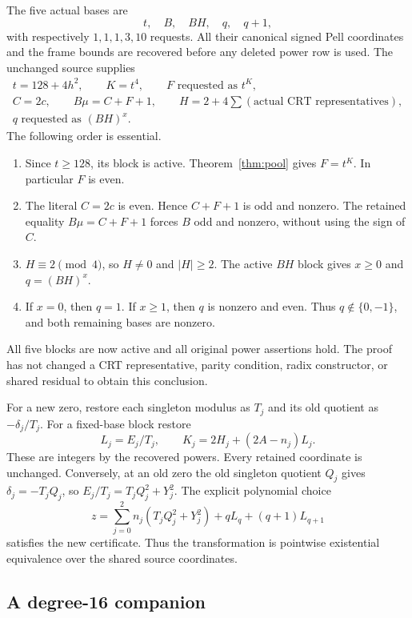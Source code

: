 The five actual bases are
\[
 t,\quad B,\quad BH,\quad q,\quad q+1,
\]
with respectively $1,1,1,3,10$ requests. All their canonical signed
Pell coordinates and the frame bounds are recovered before any deleted
power row is used. The unchanged source supplies
\begin{gather*}
 t=128+4h^2,\qquad K=t^4,\qquad F\text{ requested as }t^K,\\
 C=2c,\qquad B\mu=C+F+1,\qquad
 H=2+4\sum(\text{actual CRT representatives}),\\
 q\text{ requested as }(BH)^x.
\end{gather*}
The following order is essential.
\begin{enumerate}
\item Since $t\ge128$, its block is active. Theorem~\ref{thm:pool}
gives $F=t^K$. In particular $F$ is even.
\item The literal $C=2c$ is even. Hence $C+F+1$ is odd and nonzero.
The retained equality $B\mu=C+F+1$ forces $B$ odd and nonzero, without
using the sign of $C$.
\item $H\equiv2\pmod4$, so $H\ne0$ and $|H|\ge2$. The active
$BH$ block gives $x\ge0$ and $q=(BH)^x$.
\item If $x=0$, then $q=1$. If $x\ge1$, then $q$ is nonzero and
even. Thus $q\notin\{0,-1\}$, and both remaining bases are nonzero.
\end{enumerate}
All five blocks are now active and all original power assertions hold.
The proof has not changed a CRT representative, parity condition,
radix constructor, or shared residual to obtain this conclusion.

For a new zero, restore each singleton modulus as $T_j$ and its old
quotient as $-\delta_j/T_j$. For a fixed-base block restore
\[
 L_j=E_j/T_j,\qquad K_j=2H_j+(2A-n_j)L_j.
\]
These are integers by the recovered powers. Every retained coordinate
is unchanged. Conversely, at an old zero the old singleton quotient
$Q_j$ gives $\delta_j=-T_jQ_j$, so
$E_j/T_j=T_jQ_j^2+Y_j^2$. The explicit polynomial choice
\[
 z=\sum_{j=0}^{2}n_j(T_jQ_j^2+Y_j^2)
       +qL_q+(q+1)L_{q+1}
\]
satisfies the new certificate. Thus the transformation is pointwise
existential equivalence over the shared source coordinates.

\subsection{A degree-16 companion}

